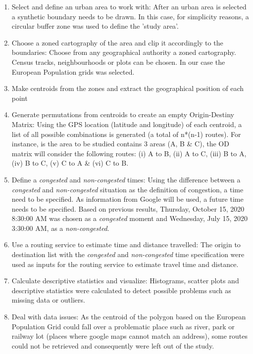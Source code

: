 \documentclass[a4paper]{jpconf}
\begin{document}
\begin{enumerate}[label=\arabic*)]
	\item Select and define an urban area to work with: After an urban area is selected a synthetic boundary needs to be drawn. In this case, for simplicity reasons, a circular buffer zone was used to define the 'study area'.
	\item Choose a zoned cartography of the area and clip it accordingly to the boundaries: Choose from any geographical authority a zoned cartography. Census tracks, neighbourhoods or plots can be chosen. In our case the European Population grids was selected.	
	\item Make centroids from the zones and extract the geographical position of each point
	\item Generate permutations from centroids to create an empty Origin-Destiny Matrix: Using the GPS location (latitude and longitude) of each centroid, a list of all possible combinations is generated (a total of n*(n-1) routes).  For instance, is the area to be studied contains 3 areas (A, B \& C), the OD matrix will consider the following routes: (i) A to B, (ii) A to C, (iii) B to A, (iv) B to C, (v) C to A \& (vi) C to B. 
	\item Define a \textit{congested} and \textit{non-congested} times: Using the difference between a \textit{congested} and \textit{non-congested} situation as the definition of congestion, a time need to be specified. As information from Google will be used, a future time needs to be specified. Based on previous results, Thursday, October 15, 2020 8:30:00 AM was chosen as a \textit{congested} moment and Wednesday, July 15, 2020 3:30:00 AM, as a \textit{non-congested}.
	\item Use a routing service to estimate time and distance travelled: The origin to destination list with the \textit{congested} and \textit{non-congested} time specification were used as inputs for the routing service to estimate travel time and distance. 
	\item Calculate descriptive statistics and visualize: Histograms, scatter plots and descriptive statistics were calculated to detect possible  problems such as missing data or outliers. 
	\item Deal with data issues: As the centroid of the polygon based on the European Population Grid could fall over a problematic place such as river, park or railway lot (places where google maps cannot match an address), some routes could not be retrieved and consequently were left out of the study.

\end{enumerate}
\end{document}
